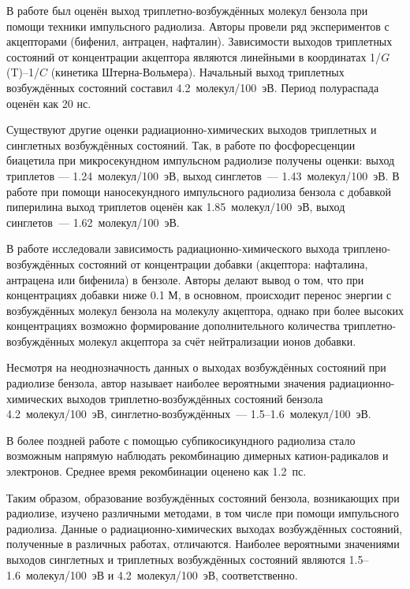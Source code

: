 {В работе \cite{Baxendale1972} был оценён выход триплетно-возбуждённых молекул бензола при помощи техники импульсного радиолиза. 
Авторы провели ряд экспериментов с акцепторами (бифенил, антрацен, нафталин). Зависимости выходов триплетных состояний от концентрации акцептора 
являются линейными в координатах 1/$G$(T)--1/$C$ (кинетика Штерна-Вольмера).
Начальный выход триплетных возбуждённых состояний составил 4.2~молекул/100~эВ. Период полураспада оценён как 20 нс.

Существуют другие оценки радиационно-химических выходов триплетных и синглетных возбуждённых состояний. Так, в работе \cite{Cundall1968} по фосфоресценции 
биацетила при микросекундном 
импульсном радиолизе получены оценки: выход триплетов --- 1.24~молекул/100~эВ, выход синглетов~--- 1.43~молекул/100~эВ.
В работе \cite{Cooper1968} при помощи наносекундного импульсного радиолиза бензола с добавкой пиперилина выход триплетов 
оценён как 1.85~молекул/100~эВ,
выход синглетов~--- 1.62~молекул/100~эВ.

В работе \cite{Land1968} исследовали зависимость радиационно-химического выхода триплено-возбуждённых состояний от концентрации добавки (акцептора: нафталина, антрацена или бифенила) в бензоле.
Авторы делают вывод о том, что при концентрациях добавки ниже 0.1 М, в основном, происходит перенос энергии с возбуждённых молекул бензола на молекулу акцептора,
однако при более высоких концентрациях возможно формирование дополнительного количества триплетно-возбуждённых молекул акцептора за счёт нейтрализации ионов добавки.

Несмотря на неоднозначность данных о выходах возбуждённых состояний при радиолизе бензола, автор \cite{z1} называет наиболее 
вероятными значения радиационно-химических 
выходов триплетно-возбуждённых состояний бензола 4.2~молекул/100~эВ, синглетно-возбуждённых~--- 1.5--1.6~молекул/100~эВ.

В более поздней работе \cite{Okamoto2003} с помощью субпикосикундного радиолиза стало возможным напрямую наблюдать рекомбинацию димерных катион-радикалов и электронов.
Среднее время рекомбинации оценено как 1.2~пс.

Таким образом, образование возбуждённых состояний бензола, возникающих при радиолизе, изучено различными методами, в том числе при помощи импульсного радиолиза. Данные о радиационно-химических выходах возбуждённых состояний, полученные в различных работах, отличаются. Наиболее вероятными значениями выходов синглетных и триплетных возбуждённых состояний являются   1.5--1.6~молекул/100~эВ и 4.2~молекул/100~эВ, соответственно.

}
